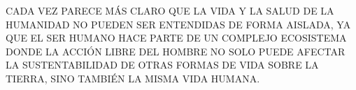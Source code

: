 \documentclass[12pt,letterpaper]{article}
\begin{document}
\pagestyle{fancy}
        \fancyhf{}
        \rhead{}
  \begin{center}
  \textrm{CADA VEZ PARECE MÁS CLARO QUE LA VIDA Y LA SALUD DE LA HUMANIDAD NO PUEDEN
SER ENTENDIDAS DE FORMA AISLADA, YA QUE EL SER HUMANO HACE PARTE DE UN COMPLEJO
ECOSISTEMA DONDE LA ACCIÓN LIBRE DEL HOMBRE NO SOLO PUEDE AFECTAR LA SUSTENTABILIDAD
DE OTRAS FORMAS DE VIDA SOBRE LA TIERRA, SINO TAMBIÉN LA MISMA VIDA HUMANA.}
\\
  \end{center}
  
\end{document}
